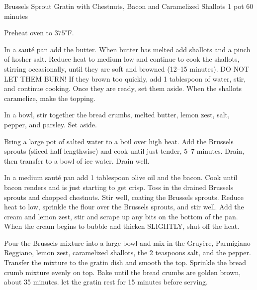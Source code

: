 \documentclass[a4paper]{article}
\begin{document}
\begin{recipe}
  {Brussels Sprout Gratin with Chestnuts, Bacon and Caramelized
  Shallots}
  {1 pot}
  {60 minutes}

Preheat oven to $375^\circ$F.


In a saut\'{e} pan add the butter.
When butter has melted add shallots and a pinch of kosher salt.
Reduce heat to medium low and continue to cook the shallots, stirring
occasionally, until they are soft and browned (12--15 minutes).
DO NOT LET THEM BURN!
If they brown too quickly, add 1 tablespoon of water, stir, and continue
cooking.
Once they are ready, set them aside.
When the shallots caramelize, make the topping.



In a bowl, stir together the bread crumbs, melted butter, lemon zest, salt,
pepper, and parsley.
Set aside.



Bring a large pot of salted water to a boil over high heat.
Add the Brussels sprouts (sliced half lengthwise) and cook until just tender,
5--7 minutes.
Drain, then transfer to a bowl of ice water.
Drain well.



In a medium saut\'e pan add 1 tablespoon olive oil and the bacon.
Cook until bacon renders and is just starting to get crisp.
Toss in the drained Brussels sprouts and chopped chestnuts.
Stir well, coating the Brussels sprouts.
Reduce heat to low, sprinkle the flour over the Brussels sprouts, and stir well.
Add the cream and lemon zest, stir and scrape up any bits on the bottom of the
pan.
When the cream begins to bubble and thicken SLIGHTLY, shut off the heat.

\newstep

Pour the Brussels mixture into a large bowl and mix in the Gruy\`ere,
Parmigiano-Reggiano, lemon zest, caramelized shallots, the 2 teaspoons salt, and
the pepper.
Transfer the mixture to the gratin dish and smooth the top.
Sprinkle the bread crumb mixture evenly on top.
Bake until the bread crumbs are golden brown, about 35 minutes.
let the gratin rest for 15 minutes before serving.

\end{recipe}
\end{document}
